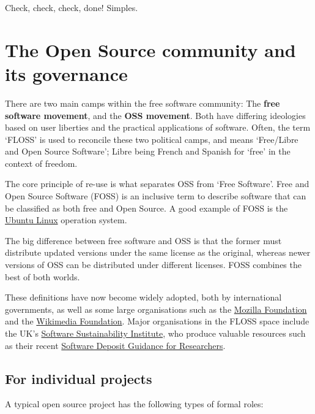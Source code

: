 \documentclass[]{book}
\begin{document}
{{{{{{{{{{{Check, check, check, done! Simples.

\hypertarget{the-open-source-community-and-its-governance}{%
\section{The Open Source community and its governance }\label{the-open-source-community-and-its-governance}}

There are two main camps within the free software community: The \textbf{free software movement}, and the \textbf{OSS movement}. Both have differing ideologies based on user liberties and the practical applications of software. Often, the term `FLOSS' is used to reconcile these two political camps, and means `Free/Libre and Open Source Software'; Libre being French and Spanish for `free' in the context of freedom.

The core principle of re-use is what separates OSS from `Free Software'. Free and Open Source Software (FOSS) is an inclusive term to describe software that can be classified as both free and Open Source. A good example of FOSS is the \href{https://www.ubuntu.com/}{Ubuntu Linux} operation system.

The big difference between free software and OSS is that the former must distribute updated versions under the same license as the original, whereas newer versions of OSS can be distributed under different licenses. FOSS combines the best of both worlds.

These definitions have now become widely adopted, both by international governments, as well as some large organisations such as the \href{https://www.mozilla.org/en-US/foundation/}{Mozilla Foundation} and the \href{https://wikimediafoundation.org/wiki/Home}{Wikimedia Foundation}. Major organisations in the FLOSS space include the UK's \href{https://www.software.ac.uk/}{Software Sustainability Institute}, who produce valuable resources such as their recent \href{https://softwaresaved.github.io/software-deposit-guidance/}{Software Deposit Guidance for Researchers}.

\hypertarget{for-individual-projects}{%
\subsection{For individual projects}\label{for-individual-projects}}

A typical open source project has the following types of formal roles:

}}}}}}}}}}}
\end{document}
